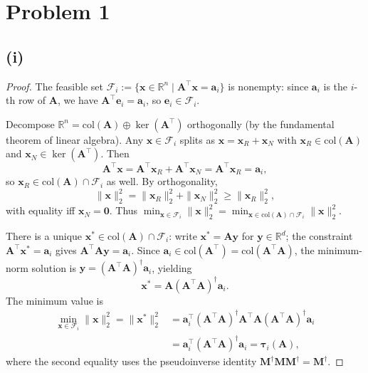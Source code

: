 \section*{Problem 1}

\subsection*{(i)}

\begin{proof}
The feasible set $\mathcal{F}_i := \{\mathbf{x} \in \mathbb{R}^n \mid \mathbf{A}^\top \mathbf{x} = \mathbf{a}_i\}$ is nonempty:
since $\mathbf{a}_i$ is the $i$-th row of $\mathbf{A}$, we have $\mathbf{A}^\top \mathbf{e}_i = \mathbf{a}_i$, so $\mathbf{e}_i \in \mathcal{F}_i$.

Decompose $\mathbb{R}^n = \mathrm{col}(\mathbf{A}) \oplus \ker(\mathbf{A}^\top)$ orthogonally (by the fundamental theorem of linear algebra). Any $\mathbf{x} \in \mathcal{F}_i$ splits as $\mathbf{x} = \mathbf{x}_R + \mathbf{x}_N$ with $\mathbf{x}_R \in \mathrm{col}(\mathbf{A})$ and $\mathbf{x}_N \in \ker(\mathbf{A}^\top)$. Then
\[
    \mathbf{A}^\top \mathbf{x} = \mathbf{A}^\top \mathbf{x}_R + \mathbf{A}^\top \mathbf{x}_N = \mathbf{A}^\top \mathbf{x}_R = \mathbf{a}_i,
\]
so $\mathbf{x}_R \in \mathrm{col}(\mathbf{A}) \cap \mathcal{F}_i$ as well. By orthogonality,
\[
    \|\mathbf{x}\|_2^2 = \|\mathbf{x}_R\|_2^2 + \|\mathbf{x}_N\|_2^2 \geq \|\mathbf{x}_R\|_2^2,
\]
with equality iff $\mathbf{x}_N = \mathbf{0}$. Thus $\min_{\mathbf{x} \in \mathcal{F}_i} \|\mathbf{x}\|_2^2 = \min_{\mathbf{x} \in \mathrm{col}(\mathbf{A}) \cap \mathcal{F}_i} \|\mathbf{x}\|_2^2$.

There is a unique $\mathbf{x}^* \in \mathrm{col}(\mathbf{A}) \cap \mathcal{F}_i$: write $\mathbf{x}^* = \mathbf{A}\mathbf{y}$ for $\mathbf{y} \in \mathbb{R}^d$; the constraint $\mathbf{A}^\top \mathbf{x}^* = \mathbf{a}_i$ gives $\mathbf{A}^\top \mathbf{A} \mathbf{y} = \mathbf{a}_i$. Since $\mathbf{a}_i \in \mathrm{col}(\mathbf{A}^\top) = \mathrm{col}(\mathbf{A}^\top \mathbf{A})$, the minimum-norm solution is $\mathbf{y} = (\mathbf{A}^\top \mathbf{A})^\dagger \mathbf{a}_i$, yielding
\[
    \mathbf{x}^* = \mathbf{A}(\mathbf{A}^\top \mathbf{A})^\dagger \mathbf{a}_i.
\]
The minimum value is
\begin{align*}
    \min_{\mathbf{x} \in \mathcal{F}_i} \|\mathbf{x}\|_2^2
    = \|\mathbf{x}^*\|_2^2
    &= \mathbf{a}_i^\top (\mathbf{A}^\top \mathbf{A})^\dagger \mathbf{A}^\top \mathbf{A} (\mathbf{A}^\top \mathbf{A})^\dagger \mathbf{a}_i \\
    &= \mathbf{a}_i^\top (\mathbf{A}^\top \mathbf{A})^\dagger \mathbf{a}_i
    = \boldsymbol{\tau}_i(\mathbf{A}),
\end{align*}
where the second equality uses the pseudoinverse identity $\mathbf{M}^\dagger \mathbf{M} \mathbf{M}^\dagger = \mathbf{M}^\dagger$.
\end{proof}

